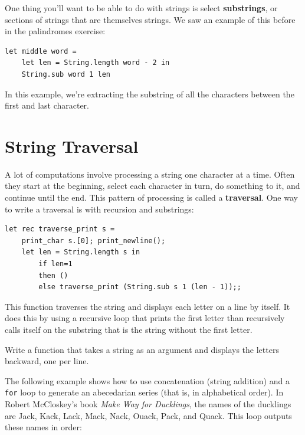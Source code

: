 \documentclass[10pt]{book}
\begin{document}
One thing you'll want to be able to do with strings is select {\bf substrings},
or sections of strings that are themselves strings. We saw an example of this 
before in the palindromes exercise:

\beforeverb
\begin{verbatim}
let middle word = 
	let len = String.length word - 2 in
	String.sub word 1 len
\end{verbatim}
\afterverb
In this example, we're extracting the substring of all the characters between 
the first and last character.


\section{String Traversal}
\label{for}


A lot of computations involve processing a string one character at a
time.  Often they start at the beginning, select each character in
turn, do something to it, and continue until the end.  This pattern of
processing is called a {\bf traversal}.  One way to write a traversal
is with recursion and substrings:

\beforeverb
\begin{verbatim}
let rec traverse_print s = 
	print_char s.[0]; print_newline();
	let len = String.length s in
		if len=1
		then ()
		else traverse_print (String.sub s 1 (len - 1));;\end{verbatim}
\afterverb
%
This function traverses the string and displays each letter on a line by
itself. It does this by using a recursive loop that prints the first letter
than recursively calls itself on the substring that is the string without
the first letter.

\begin{ex}
Write a function that takes a string as an argument
and displays the letters backward, one per line.
\end{ex}


The following example shows how to use concatenation (string addition)
and a {\tt for} loop to generate an abecedarian series (that is, in
alphabetical order).  In Robert McCloskey's book {\em Make
Way for Ducklings}, the names of the ducklings are Jack, Kack, Lack,
Mack, Nack, Ouack, Pack, and Quack.  This loop outputs these names in
order:
\end{document}
